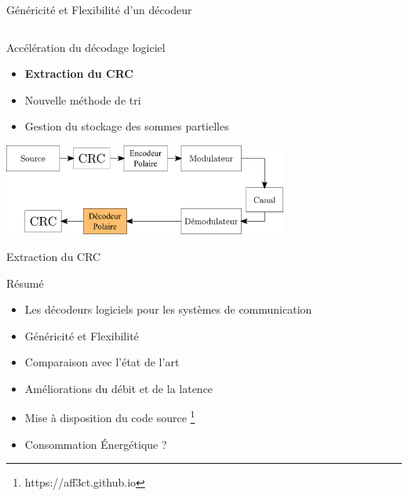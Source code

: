 \begin{frame}[c]{Généricité et Flexibilité d'un décodeur}
\begin{table}[t]
{{\begin{tabular}{r|C{1.5cm}C{1.5cm}C{1.5cm}C{2cm}}
    	\end{tabular}
    }}
  \end{table}
  
\end{frame}

\begin{frame}[c]{Accélération du décodage logiciel}
  \only<+>
  {
	\begin{itemize}
		\vfill
		\item \textbf{Extraction du CRC}
		\vfill
		\item Nouvelle méthode de tri
		\vfill
		\item Gestion du stockage des sommes partielles
		\vfill
	\end{itemize}
  }
\end{frame}


\begin{frame}
\vfill
\centering
  \includegraphics[width=0.7\textwidth]{./fig/extract-1}
  \vfill
\end{frame}

\begin{frame}[c]{Extraction du CRC}
	\centering

\end{frame}

\begin{frame}[c]{Résumé}
	\begin{itemize}
		\vfill
		\item Les décodeurs logiciels pour les systèmes de communication
		\vfill
		\item Généricité et Flexibilité
		\vfill
		\item Comparaison avec l'état de l'art
		\vfill
		\item Améliorations du débit et de la latence
		\vfill
    \item Mise à disposition du code source \footnote{https://aff3ct.github.io}
    \vfill
		\item Consommation \'Energétique ?
		\vfill
	\end{itemize}
\end{frame}

